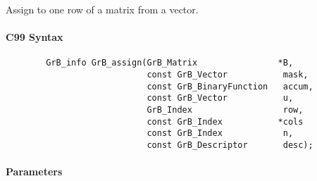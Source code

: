 Assign to one row of a matrix from a vector.  

\paragraph{C99 Syntax}

\begin{verbatim}
        GrB_info GrB_assign(GrB_Matrix                *B,
                            const GrB_Vector           mask,
                            const GrB_BinaryFunction   accum,
                            const GrB_Vector           u,
                            GrB_Index                  row,
                            const GrB_Index           *cols
                            const GrB_Index            n,
                            const GrB_Descriptor       desc); 
\end{verbatim}

\paragraph{Parameters}

